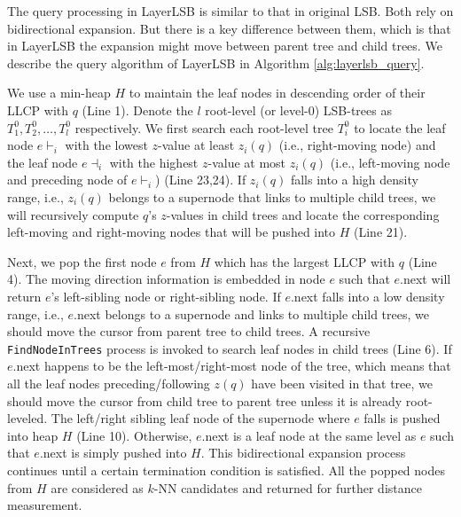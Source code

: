 The query processing in LayerLSB is similar to that in original LSB. Both rely on bidirectional expansion. But there is a key difference between them, which is that in LayerLSB the expansion might move between parent tree and child trees. We describe the query algorithm of LayerLSB in Algorithm \ref{alg:layerlsb_query}.

We use a min-heap $H$ to maintain the leaf nodes in descending order of their LLCP with $q$ (Line 1). Denote the $l$ root-level (or level-0) LSB-trees as $T^0_1,T^0_2,\ldots,T^0_l$ respectively. We first search each root-level tree $T^0_i$ to locate the leaf node $e\vdash_i$ with the lowest $z$-value at least $z_i(q)$ (i.e., right-moving node) and the leaf node $e\dashv_{i}$ with the highest $z$-value at most $z_i(q)$ (i.e., left-moving node and preceding node of $e\vdash_i$) (Line 23,24). If $z_i(q)$ falls into a high density range, i.e., $z_i(q)$ belongs to a supernode that links to multiple child trees, we will recursively compute $q$'s $z$-values in child trees and locate the corresponding left-moving and right-moving nodes that will be pushed into $H$ (Line 21).

Next, we pop the first node $e$ from $H$ which has the largest LLCP with $q$ (Line 4). The moving direction information is embedded in node $e$ such that $e$.next will return $e$'s left-sibling node or right-sibling node. If $e$.next falls into a low density range, i.e., $e$.next belongs to a supernode and links to multiple child trees, we should move the cursor from parent tree to child trees. A recursive \texttt{FindNodeInTrees} process is invoked to search leaf nodes in child trees (Line 6). If $e$.next happens to be the left-most/right-most node of the tree, which means that all the leaf nodes preceding/following $z(q)$ have been visited in that tree, we should move the cursor from child tree to parent tree unless it is already root-leveled. The left/right sibling leaf node of the supernode where $e$ falls is pushed into heap $H$ (Line 10). Otherwise, $e$.next is a leaf node at the same level as $e$ such that $e$.next is simply pushed into $H$. This bidirectional expansion process continues until a certain termination condition is satisfied. All the popped nodes from $H$ are considered as $k$-NN candidates and returned for further distance measurement.

